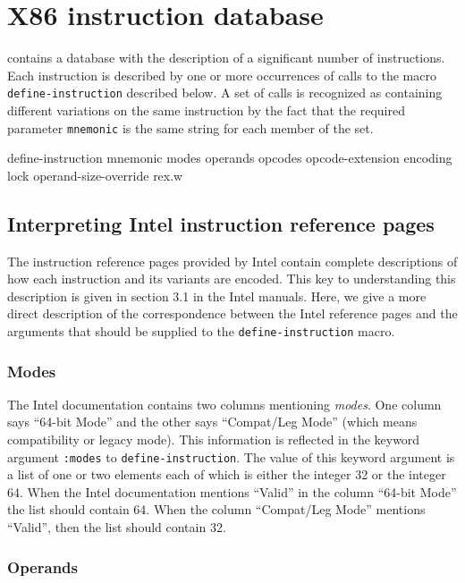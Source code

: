 \chapter{X86 instruction database}

\sysname{} contains a database with the description of a significant
number of instructions.  Each instruction is described by one or more
occurrences of calls to the macro \texttt{define-instruction}
described below.  A set of calls is recognized as containing different
variations on the same instruction by the fact that the required
parameter \texttt{mnemonic} is the same string for each member of the
set.

 define-instruction {mnemonic \key 
				       modes
				       operands
				       opcodes
				       opcode-extension
				       encoding
				       lock
				       operand-size-override
				       rex.w}

\section{Interpreting Intel instruction reference pages}

The instruction reference pages provided by Intel contain complete
descriptions of how each instruction and its variants are encoded.
This key to understanding this description is given in section 3.1 in
the Intel manuals.  Here, we give a more direct description of the
correspondence between the Intel reference pages and the arguments
that should be supplied to the \texttt{define-instruction} macro.

\subsection{Modes}

The Intel documentation contains two columns mentioning \emph{modes}.
One column says ``64-bit Mode'' and the other says ``Compat/Leg Mode''
(which means compatibility or legacy mode).  This information is
reflected in the keyword argument \texttt{:modes} to
\texttt{define-instruction}.  The value of this keyword argument is a
list of one or two elements each of which is either the integer 32 or
the integer 64.  When the Intel documentation mentions ``Valid'' in
the column ``64-bit Mode'' the list should contain 64.  When the
column ``Compat/Leg Mode'' mentions ``Valid'', then the list should
contain 32.

\subsection{Operands}

